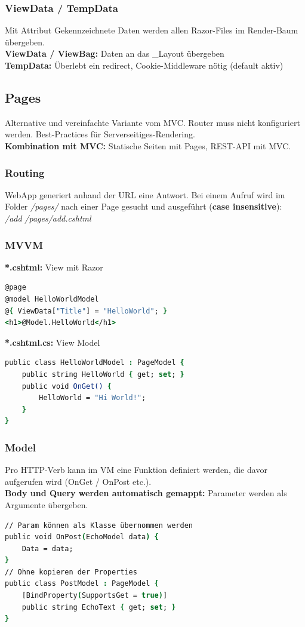 \subsubsection{ViewData / TempData}
Mit Attribut Gekennzeichnete Daten werden allen Razor-Files im Render-Baum übergeben.\\
\textbf{ViewData / ViewBag:} Daten an das \_Layout übergeben\\
\textbf{TempData:} Überlebt ein redirect, Cookie-Middleware nötig (default aktiv)

\subsection{Pages}
Alternative und vereinfachte Variante vom MVC.
Router muss nicht konfiguriert werden.
Best-Practices für Serverseitiges-Rendering.\\
\textbf{Kombination mit MVC:} Statische Seiten mit Pages, REST-API mit MVC.

\subsubsection{Routing}
WebApp generiert anhand der URL eine Antwort.
Bei einem Aufruf wird im Folder \textit{/pages/} nach einer Page gesucht und ausgeführt (\textbf{case insensitive}):\\
\textit{/add} \textrightarrow \textit{/pages/add.cshtml}

\subsubsection{MVVM}
\textbf{*.cshtml:} View mit Razor
\begin{lstlisting}[language=csh]
@page
@model HelloWorldModel
@{ ViewData["Title"] = "HelloWorld"; }
<h1>@Model.HelloWorld</h1>
\end{lstlisting}
\textbf{*.cshtml.cs:} View Model
\begin{lstlisting}[language=csh]
public class HelloWorldModel : PageModel {
    public string HelloWorld { get; set; }
    public void OnGet() {
        HelloWorld = "Hi World!";
    }
}
\end{lstlisting}

\subsubsection{Model}
Pro HTTP-Verb kann im VM eine Funktion definiert werden, die davor aufgerufen wird (OnGet / OnPost etc.).\\
\textbf{Body und Query werden automatisch gemappt:} Parameter werden als Argumente übergeben.
\begin{lstlisting}[language=csh]
// Param können als Klasse übernommen werden
public void OnPost(EchoModel data) {
    Data = data;
}
// Ohne kopieren der Properties
public class PostModel : PageModel {
    [BindProperty(SupportsGet = true)]
    public string EchoText { get; set; }
}
\end{lstlisting}

